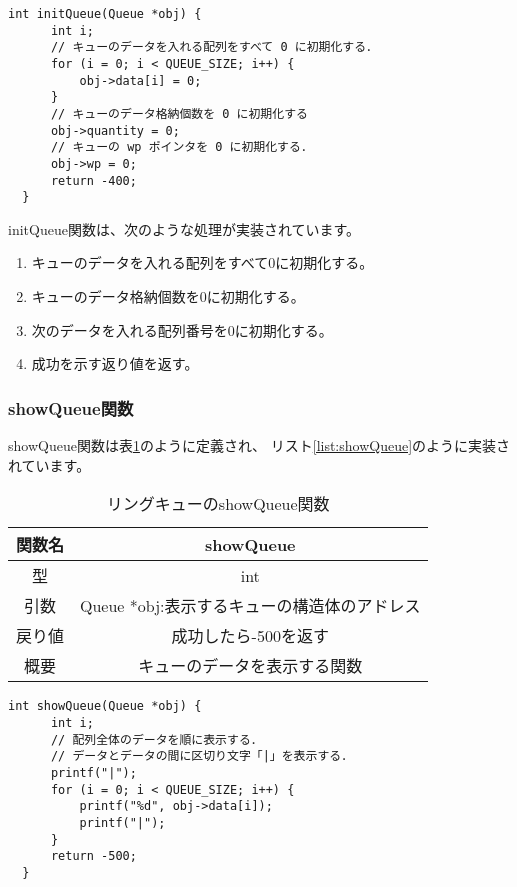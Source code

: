 \documentclass[a4j]{jarticle}
\begin{document}
\begin{lstlisting}[caption=リングキューのinitQueue関数の実装,label=list:ringinitQueue]
  int initQueue(Queue *obj) {
      int i;
      // キューのデータを入れる配列をすべて 0 に初期化する．
      for (i = 0; i < QUEUE_SIZE; i++) {
          obj->data[i] = 0;
      }
      // キューのデータ格納個数を 0 に初期化する
      obj->quantity = 0;
      // キューの wp ポインタを 0 に初期化する．
      obj->wp = 0;
      return -400;
  }
\end{lstlisting}

initQueue関数は、次のような処理が実装されています。
\begin{enumerate}
  \item キューのデータを入れる配列をすべて0に初期化する。
  \item キューのデータ格納個数を0に初期化する。
  \item 次のデータを入れる配列番号を0に初期化する。
  \item 成功を示す返り値を返す。
\end{enumerate}

\subsubsection{showQueue関数}
showQueue関数は表\ref{table:showQueue}のように定義され、
リスト\ref{list:showQueue}のように実装されています。

\begin{table}[htbp]
  \centering
  \caption{リングキューのshowQueue関数}
  \label{table:showQueue}
  \begin{tabular}{|c|c|}
    \hline
    関数名 & showQueue                   \\
    \hline
    型   & int                         \\
    \hline
    引数  & Queue *obj:表示するキューの構造体のアドレス \\
    \hline
    戻り値 & 成功したら-500を返す                \\
    \hline
    概要  & キューのデータを表示する関数              \\
    \hline
  \end{tabular}
\end{table}

\begin{lstlisting}[caption=リングキューのshowQueue関数の実装,label=list:showQueue]
  int showQueue(Queue *obj) {
      int i;
      // 配列全体のデータを順に表示する．
      // データとデータの間に区切り文字「|」を表示する．
      printf("|");
      for (i = 0; i < QUEUE_SIZE; i++) {
          printf("%d", obj->data[i]);
          printf("|");
      }
      return -500;
  }
\end{lstlisting}
\end{document}
